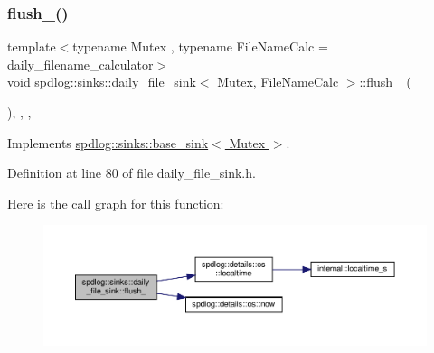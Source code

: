 \subsubsection{\texorpdfstring{flush\+\_\+()}{flush\_()}}
{\footnotesize\ttfamily template$<$typename Mutex , typename File\+Name\+Calc  = daily\+\_\+filename\+\_\+calculator$>$ \\
void \hyperlink{classspdlog_1_1sinks_1_1daily__file__sink}{spdlog\+::sinks\+::daily\+\_\+file\+\_\+sink}$<$ Mutex, File\+Name\+Calc $>$\+::flush\+\_\+ (\begin{DoxyParamCaption}{ }\end{DoxyParamCaption})\hspace{0.3cm}{\ttfamily [inline]}, {\ttfamily [override]}, {\ttfamily [protected]}, {\ttfamily [virtual]}}



Implements \hyperlink{classspdlog_1_1sinks_1_1base__sink_a5ac2b237c60f68a18122a1ca09b812b4}{spdlog\+::sinks\+::base\+\_\+sink$<$ Mutex $>$}.



Definition at line 80 of file daily\+\_\+file\+\_\+sink.\+h.

Here is the call graph for this function\+:
\nopagebreak
\begin{figure}[H]
\begin{center}
\leavevmode
\includegraphics[width=350pt]{classspdlog_1_1sinks_1_1daily__file__sink_a37199f25868ac70b91e4f126bcc4b3f8_cgraph}
\end{center}
\end{figure}
\mbox{\label{classspdlog_1_1sinks_1_1daily__file__sink_ac82447cddb7a2ddb45ab81f97b74286d}} 

